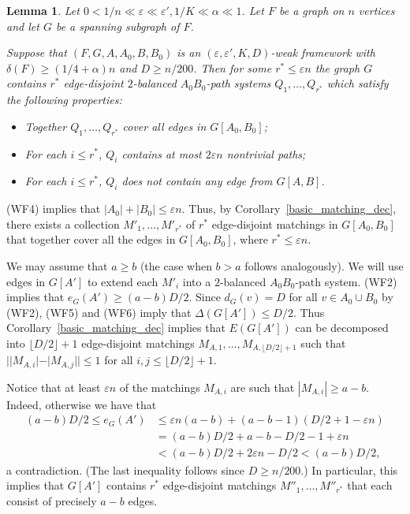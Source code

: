 \documentclass{memo-l}
\newtheorem{lemma}[firstthm]{Lemma}
\def\COMMENT#1{}
\def\proof{\removelastskip\penalty55\medskip\noindent{\bf Proof. }}
\def\eps{\varepsilon}
\numberwithin{section}{chapter}
\numberwithin{equation}{section}
\numberwithin{firstthm}{section}
\numberwithin{figure}{section}
\begin{document}
{\begin{lemma}\label{coverA0B01}
Let $0<1/n\ll \varepsilon \ll  \varepsilon',1/K\ll \alpha\ll 1$.
Let $F$ be a graph on $n$ vertices and let $G$ be a spanning subgraph of $F$.%
	\COMMENT{AL:add condition for $F$ and $G$}
Suppose that $(F,G,A,A_0,B,B_0)$
is an $(\eps,\eps',K,D)$-weak framework with $\delta(F)\ge (1/4+\alpha )n$
and  $D\geq n/200$.
Then for some $r^* \le \eps n$ the graph $G$ contains $r^*$ edge-disjoint
$2$-balanced $A_0B_0$-path systems $Q_1, \dots , Q_{r^*}$ which satisfy the following
properties:
\begin{itemize}
\item[{\rm (i)}] Together $Q_1,\dots,Q_{r^*}$  cover all edges in $G[A_0, B_0]$;
\item[{\rm (ii)}] For each $i \leq r^*$, $Q_i$ contains at most $2 \eps n$ nontrivial paths;
\item[{\rm (iii)}] For each $i \leq r^*$, $Q_i$ does not contain any edge from $G[A,B]$.
\end{itemize}
\end{lemma}
\proof
(WF4) implies that $|A_0|+|B_0|\leq \eps n$. Thus, by Corollary~\ref{basic_matching_dec}, there exists a collection $M'_1,
\dots , M'_{r^*}$ of $r^*$ edge-disjoint matchings in $G[A_0,B_0]$ that together cover all the
edges in $G[A_0,B_0]$, where $r^* \leq \eps n$. 

We may assume that $a \geq b$ (the case when $b>a$ follows analogously).
We will use  edges in $G[A']$ to extend each $M'_i$ into a $2$-balanced $A_0B_0$-path system. 
(WF2) implies that $e_G (A') \geq (a-b)D/2$. Since $d_G (v)=D$ for all $v \in A_0 \cup B_0$ by (WF2),
(WF5) and (WF6) imply that $\Delta (G[A']) \leq D/2$.
Thus Corollary~\ref{basic_matching_dec} implies that $E(G[A'])$ can be decomposed
into $\lfloor D/2 \rfloor+1$ edge-disjoint matchings $M_{A,1}, \dots , M_{A,\lfloor D/2 \rfloor+1}$ such that $||M_{A,i}|-|M_{A,j}|| \leq 1$ for all $i,j \leq \lfloor D/2 \rfloor+1$.

Notice that at least $\eps n$ of the matchings $M_{A,i}$ are such that $|M_{A,i}|\geq a-b$.
Indeed, otherwise we have that 
\begin{align*}
(a-b)D/2 \leq e_G (A') & \leq \eps n (a-b) +(a-b-1)(D/2+1-\eps n) 
\\ & = (a-b)D/2 + a-b-D/2-1+\eps n \\ &< (a-b)D/2 +2\eps n -D/2 < (a-b)D/2 ,
\end{align*}
a contradiction. (The last inequality follows since $D \geq n/200$.)
In particular, this implies that $G[A']$ contains $r^*$ edge-disjoint matchings $M''_1, \dots ,M''_{r^*}$ 
that each consist of precisely $a-b$ edges. 

}
\end{document}
